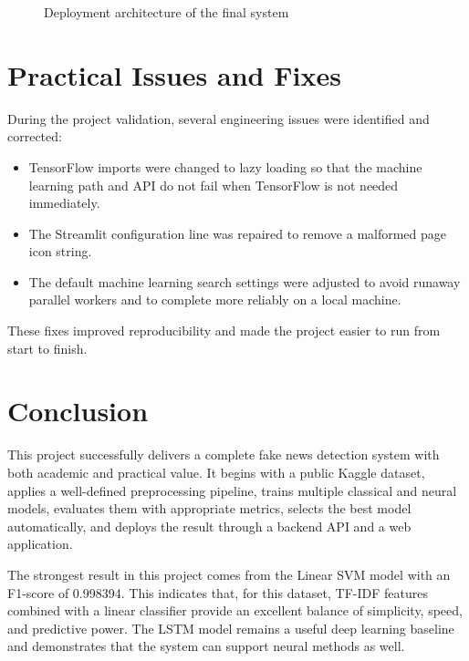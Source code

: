 \documentclass[12pt,a4paper]{article}
\begin{document}
\begin{figure}[H]
\centering
{}
\caption{Deployment architecture of the final system}
\label{fig:deployment}
\end{figure}

\section{Practical Issues and Fixes}
During the project validation, several engineering issues were identified and corrected:
\begin{itemize}[leftmargin=*]
\item TensorFlow imports were changed to lazy loading so that the machine learning path and API do not fail when TensorFlow is not needed immediately.
\item The Streamlit configuration line was repaired to remove a malformed page icon string.
\item The default machine learning search settings were adjusted to avoid runaway parallel workers and to complete more reliably on a local machine.
\end{itemize}

These fixes improved reproducibility and made the project easier to run from start to finish.

\section{Conclusion}
This project successfully delivers a complete fake news detection system with both academic and practical value. It begins with a public Kaggle dataset, applies a well-defined preprocessing pipeline, trains multiple classical and neural models, evaluates them with appropriate metrics, selects the best model automatically, and deploys the result through a backend API and a web application.

The strongest result in this project comes from the Linear SVM model with an F1-score of 0.998394. This indicates that, for this dataset, TF-IDF features combined with a linear classifier provide an excellent balance of simplicity, speed, and predictive power. The LSTM model remains a useful deep learning baseline and demonstrates that the system can support neural methods as well.
\end{document}
